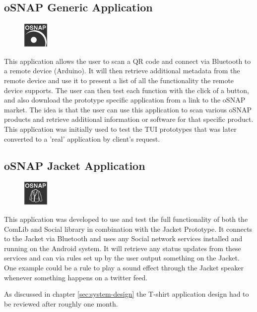 \subsection{oSNAP Generic Application} \label{section:app-generic}
\begin{figure}
	\centering \includegraphics[scale=1]{img/app-generic}
\end{figure}
This application allows the user to scan a QR code and connect via Bluetooth to a remote device (Arduino).
It will then retrieve additional metadata from the remote device and use it to present a list of all the
functionality the remote device supports. The user can then test each function with the click of a button,
and also download the prototype specific application from a link to the oSNAP market.
The idea is that the user can use this application to scan various oSNAP products and retrieve
additional information or software for that specific product. This application was initially used to test
the TUI prototypes that was later converted to a 'real' application by client's request.

\subsection{oSNAP Jacket Application} \label{section:app-jacket}
\begin{figure}
	\centering \includegraphics[scale=1]{img/app-jacket}
\end{figure}
This application was developed to use and test the full functionality of both the ComLib and Social library in combination with the
Jacket Prototype. It connects to the Jacket via Bluetooth and uses any Social network services installed and running on the
Android system. It will retrieve any status updates from these services and can via rules set up by the user output something
on the Jacket. One example could be a rule to play a sound effect through the Jacket speaker whenever something happens
on a twitter feed.

As discussed in chapter \ref{sec:system-design} the T-shirt application design had to be reviewed after roughly one month.

